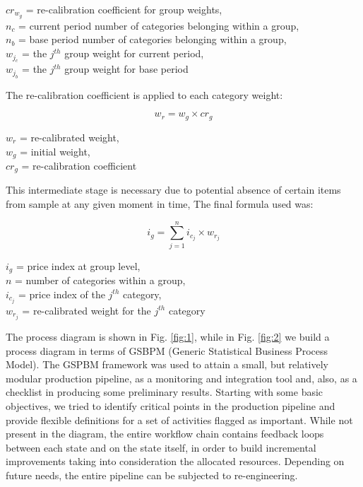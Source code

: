\documentclass[]{article}
\begin{document}
\begin{center}
	$cr_{w_{g}}$ = re-calibration coefficient for group weights, \\
	$n_{c}$ = current period number of categories belonging within a group, \\
	$n_{b}$ = base period number of categories belonging within a group, \\
	$w_{j_{c}}$ = the $j^{th}$ group weight for current period, \\
	$w_{j_{b}}$ = the $j^{th}$ group weight for base period
	
\end{center}

The re-calibration coefficient is applied to each category weight:

\begin{equation}\label{eq:7}
  w_{r} = w_{g} \times cr_{g}
\end{equation}

\begin{center}
	$w_{r}$ = re-calibrated weight, \\
	$w_{g}$ = initial weight, \\
	$cr_{g}$ = re-calibration coefficient
\end{center}

This intermediate stage is necessary due to potential absence of certain items from sample at any given moment in time, 
The final formula used was:

\begin{equation}\label{eq:8}
	i_{g} = \sum_{j=1}^{n} i_{c_{j}} \times w_{r_{j}}
\end{equation}

\begin{center}
	$i_{g}$ = price index at group level, \\
	$n$ = number of categories within a group, \\
	$i_{c_{j}}$ = price index of the $j^{th}$ category, \\
	$w_{r_{j}}$ = re-calibrated weight for the $j^{th}$ category
\end{center}

The process diagram is shown in Fig. \ref{fig:1}, while in Fig. \ref{fig:2} we build a process diagram in terms of GSBPM (Generic Statistical Business Process Model)\cite{gsbpm}. The GSPBM framework was used to attain a small, but relatively modular production pipeline, as a monitoring and integration tool and, also, as a checklist in producing some preliminary results. Starting with some basic objectives, we tried to identify critical points in the production pipeline and provide flexible definitions for a set of activities flagged as important. While not present in the diagram, the entire workflow chain contains feedback loops between each state and on the state itself, in order to build incremental improvements taking into consideration the allocated resources. Depending on future needs, the entire pipeline can be subjected to re-engineering.      
\end{document}
